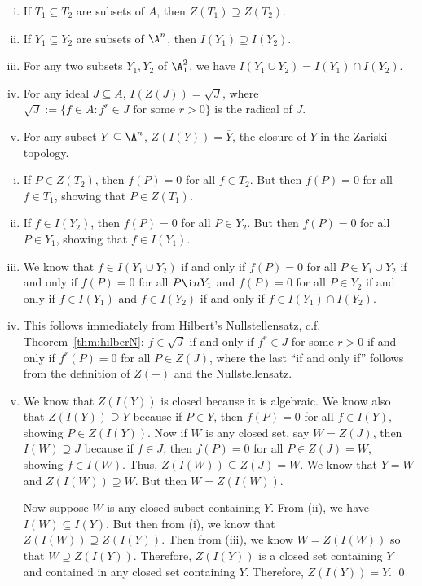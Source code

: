 \begin{prop} \label{prop:ziproperties} \hfill
\begin{enumerate}[(i)]
\item If $T_1 \subseteq T_2$ are subsets of $A$, then $Z(T_1) \supseteq Z(T_2)$.
\item If $Y_1 \subseteq Y_2$ are subsets of $\A^n$, then $I(Y_1) \supseteq I(Y_2)$.
\item For any two subsets $Y_1,Y_2$ of $\A_1^2$, we have $I(Y_1 \cup Y_2)= I(Y_1) \cap I(Y_2)$. 
\item For any ideal $J \subseteq A$, $I(Z(J))= \sqrt{J}$, where $\sqrt{J}:= \{ f \in A \colon f^r \in J \text{ for some } r>0 \}$ is the radical of $J$. 
\item For any subset $Y \subseteq \A^n$, $Z(I(Y))= \overline{Y}$, the closure of $Y$ in the Zariski topology. 
\end{enumerate}
\end{prop}

\pf \hfill
\begin{enumerate}[(i)]
\item If $P \in Z(T_2)$, then $f(P)= 0$ for all $f \in T_2$. But then $f(P)= 0$ for all $f \in T_1$, showing that $P \in Z(T_1)$.

\item If $f \in I(Y_2)$, then $f(P)= 0$ for all $P \in Y_2$. But then $f(P)= 0$ for all $P \in Y_1$, showing that $f \in I(Y_1)$. 

\item We know that $f \in I(Y_1 \cup Y_2)$ if and only if $f(P)= 0$ for all $P \in Y_1 \cup Y_2$ if and only if $f(P)= 0$ for all $P \i nY_1$ and $f(P)= 0$ for all $P \in Y_2$ if and only if $f \in I(Y_1)$ and $f \in I(Y_2)$ if and only if $f \in I(Y_1) \cap I(Y_2)$. 

\item This follows immediately from Hilbert's Nullstellensatz, c.f. Theorem~\ref{thm:hilberN}:  $f \in \sqrt{J}$ if and only if $f^r \in J$ for some $r>0$ if and only if $f^r(P)=0$ for all $P \in Z(J)$, where the last ``if and only if'' follows from the definition of $Z(-)$ and the Nullstellensatz. 

\item We know that $Z(I(Y))$ is closed because it is algebraic. We know also that $Z(I(Y)) \supseteq Y$ because if $P \in Y$, then $f(P)= 0$ for all $f \in I(Y)$, showing $P \in Z(I(Y))$. Now if $W$ is any closed set, say $W= Z(J)$, then $I(W) \supseteq J$ because if $f \in J$, then $f(P)= 0$ for all $P \in Z(J)= W$, showing $f \in I(W)$. Thus, $Z(I(W)) \subseteq Z(J)= W$. We know that $Y=W$ and $Z(I(W)) \supseteq W$. But then $W= Z(I(W))$. 

Now suppose $W$ is any closed subset containing $Y$. From (ii), we have $I(W) \subseteq I(Y)$. But then from (i), we know that $Z(I(W)) \supseteq Z(I(Y))$. Then from (iii), we know $W= Z(I(W))$ so that $W \supseteq Z(I(Y))$. Therefore, $Z(I(Y))$ is a closed set containing $Y$ and contained in any closed set containing $Y$. Therefore, $Z(I(Y))= \overline{Y}$. \qed \\
\end{enumerate}


